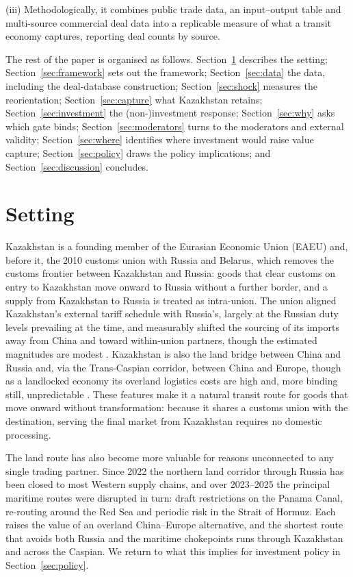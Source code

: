 \documentclass[12pt]{article}
\begin{document}
(iii) Methodologically,
it combines public trade data, an input--output table and multi-source commercial deal data
into a replicable measure of what a transit economy captures, reporting deal counts by source.

The rest of the paper is organised as follows. Section~\ref{sec:setting} describes the
setting; Section~\ref{sec:framework} sets out the framework; Section~\ref{sec:data} the data,
including the deal-database construction; Section~\ref{sec:shock} measures the reorientation;
Section~\ref{sec:capture} what Kazakhstan retains; Section~\ref{sec:investment} the
(non-)investment response; Section~\ref{sec:why} asks which gate binds;
Section~\ref{sec:moderators} turns to the moderators and external validity;
Section~\ref{sec:where} identifies where investment would raise value capture;
Section~\ref{sec:policy} draws the policy implications; and
Section~\ref{sec:discussion} concludes.

\section{Setting}\label{sec:setting}

Kazakhstan is a founding member of the Eurasian Economic Union (EAEU) and, before it, the 2010
customs union with Russia and Belarus, which removes the customs
frontier between Kazakhstan and Russia: goods that clear customs on entry to Kazakhstan move
onward to Russia without a further border, and a supply from Kazakhstan to Russia is treated
as intra-union. The union aligned Kazakhstan's external tariff schedule with Russia's, largely
at the Russian duty levels prevailing at the time, and measurably shifted the sourcing of its
imports away from China and toward within-union partners, though the estimated magnitudes are modest
\citep{isakova2016tariffs}. Kazakhstan is also the land bridge between China and Russia and,
via the Trans-Caspian corridor, between China and Europe, though as a landlocked economy its
overland logistics costs are high and, more binding still, unpredictable
\citep{arvis2010landlocked}. These features make it a natural transit route for goods that move onward without transformation: because it shares a customs union with the destination,
serving the final market from Kazakhstan requires no domestic processing.

The land route has also become more valuable for reasons unconnected to any single trading
partner. Since 2022 the northern land corridor through Russia has been closed to most Western
supply chains, and over 2023--2025 the principal maritime routes were disrupted in turn: draft
restrictions on the Panama Canal, re-routing around the Red Sea and periodic risk in the
Strait of Hormuz. Each raises the value of an overland China--Europe alternative, and the
shortest route that avoids both Russia and the maritime chokepoints runs through Kazakhstan
and across the Caspian. We return to what this implies for investment policy in
Section~\ref{sec:policy}.
\end{document}
